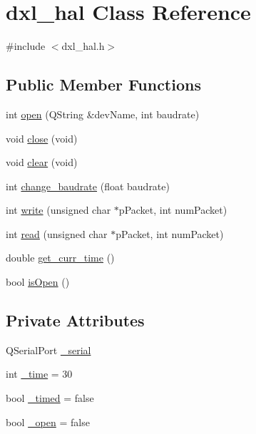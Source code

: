 \hypertarget{classdxl__hal}{}\section{dxl\+\_\+hal Class Reference}
\label{classdxl__hal}


{\ttfamily \#include $<$dxl\+\_\+hal.\+h$>$}

\subsection*{Public Member Functions}
\begin{DoxyCompactItemize}
\item 
int \hyperlink{classdxl__hal_a5b91f0f0b4a61fa113f9919e07e5a329}{open} (Q\+String \&dev\+Name, int baudrate)
\item 
void \hyperlink{classdxl__hal_a250fd7e4acabf54d0733551a13e89a2d}{close} (void)
\item 
void \hyperlink{classdxl__hal_a004eedde5af69219d7288ec8ea97c89f}{clear} (void)
\item 
int \hyperlink{classdxl__hal_a0eaaa5340bc9dce73cc920dc8befe5b0}{change\+\_\+baudrate} (float baudrate)
\item 
int \hyperlink{classdxl__hal_a90106970438fb0ab65852730a1c0776a}{write} (unsigned char $\ast$p\+Packet, int num\+Packet)
\item 
int \hyperlink{classdxl__hal_ac36331febb2eaa66303af3483795742a}{read} (unsigned char $\ast$p\+Packet, int num\+Packet)
\item 
double \hyperlink{classdxl__hal_a6b6b7381c45308662fc3df6e7f74bc61}{get\+\_\+curr\+\_\+time} ()
\item 
bool \hyperlink{classdxl__hal_a88bba601b5c9f285fcdc14e18a1f3398}{is\+Open} ()
\end{DoxyCompactItemize}
\subsection*{Private Attributes}
\begin{DoxyCompactItemize}
\item 
Q\+Serial\+Port \hyperlink{classdxl__hal_a785d0e35b81d779b54869cad668f9745}{\+\_\+serial}
\item 
int \hyperlink{classdxl__hal_ae3d8733b5ca778b070218765ca0746ac}{\+\_\+time} = 30
\item 
bool \hyperlink{classdxl__hal_a10d474daa3ca42b5c5ceb6558a955ca1}{\+\_\+timed} = false
\item 
bool \hyperlink{classdxl__hal_a04831154c43fe4f7499ea0950e0f0999}{\+\_\+open} = false
\end{DoxyCompactItemize}


